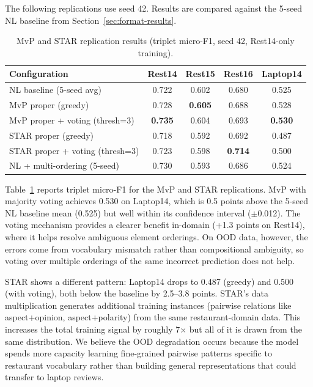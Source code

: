 \documentclass[12pt,a4paper]{report}
\begin{document}
The following replications use seed 42. Results are compared against the 5-seed NL baseline from Section~\ref{sec:format-results}.

\begin{table}[H]
\centering
\caption{MvP and STAR replication results (triplet micro-F1, seed 42, Rest14-only training).}
\label{tab:mvp-star}
\small
\begin{tabular}{@{}lcccc@{}}
\toprule
\textbf{Configuration} & \textbf{Rest14} & \textbf{Rest15} & \textbf{Rest16} & \textbf{Laptop14} \\
\midrule
NL baseline (5-seed avg) & 0.722 & 0.602 & 0.680 & 0.525 \\
\midrule
MvP proper (greedy) & 0.728 & \textbf{0.605} & 0.688 & 0.528 \\
MvP proper + voting (thresh=3) & \textbf{0.735} & 0.604 & 0.693 & \textbf{0.530} \\
STAR proper (greedy) & 0.718 & 0.592 & 0.692 & 0.487 \\
STAR proper + voting (thresh=3) & 0.723 & 0.598 & \textbf{0.714} & 0.500 \\
\midrule
NL + multi-ordering (5-seed) & 0.730 & 0.593 & 0.686 & 0.524 \\
\bottomrule
\end{tabular}
\end{table}

Table~\ref{tab:mvp-star} reports triplet micro-F1 for the MvP and STAR replications. MvP with majority voting achieves 0.530 on Laptop14, which is 0.5 points above the 5-seed NL baseline mean (0.525) but well within its confidence interval ($\pm$0.012). The voting mechanism provides a clearer benefit in-domain (+1.3 points on Rest14), where it helps resolve ambiguous element orderings. On OOD data, however, the errors come from vocabulary mismatch rather than compositional ambiguity, so voting over multiple orderings of the same incorrect prediction does not help.

STAR shows a different pattern: Laptop14 drops to 0.487 (greedy) and 0.500 (with voting), both below the baseline by 2.5--3.8 points. STAR's data multiplication generates additional training instances (pairwise relations like aspect+opinion, aspect+polarity) from the same restaurant-domain data. This increases the total training signal by roughly 7$\times$ but all of it is drawn from the same distribution. We believe the OOD degradation occurs because the model spends more capacity learning fine-grained pairwise patterns specific to restaurant vocabulary rather than building general representations that could transfer to laptop reviews.
\end{document}
